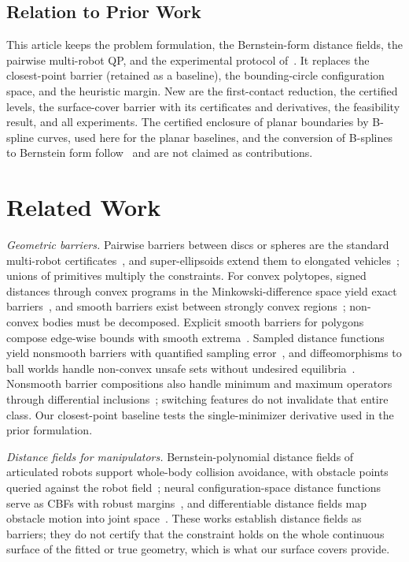 \documentclass[journal]{IEEEtran}
\theoremstyle{definition}
\begin{document}
\subsection{Relation to Prior Work}\label{sec:relation}
This article keeps the problem formulation, the Bernstein-form distance fields, the pairwise
multi-robot QP, and the experimental protocol of~\cite{jo2026geometry}. It replaces the
closest-point barrier (retained as a baseline), the bounding-circle configuration space, and the
heuristic margin. New are the first-contact reduction, the certified levels, the surface-cover
barrier with its certificates and derivatives, the feasibility result, and all experiments. The
certified enclosure of planar boundaries by B-spline curves, used here for the planar baselines, and
the conversion of B-splines to Bernstein form follow~\cite{jo2027semantic} and are not claimed as
contributions.

\section{Related Work}\label{sec:related}

\emph{Geometric barriers.} Pairwise barriers between discs or spheres are the standard multi-robot
certificates~\cite{wang2017safety}, and super-ellipsoids extend them to elongated
vehicles~\cite{wang2017quadrotors}; unions of primitives multiply the constraints. For convex
polytopes, signed distances through convex programs in the Minkowski-difference space yield exact
barriers~\cite{chen2025minkowski,chen2026exact}, and smooth barriers exist between strongly convex
regions~\cite{thirugnanam2025strongly}; non-convex bodies must be decomposed. Explicit smooth
barriers for polygons compose edge-wise bounds with smooth extrema~\cite{wu2025optimization}.
Sampled distance functions yield nonsmooth barriers with quantified sampling
error~\cite{lutkus2025sampling}, and diffeomorphisms to ball worlds handle non-convex unsafe sets
without undesired equilibria~\cite{notomista2021nonconvex}.
Nonsmooth barrier compositions also handle minimum and maximum operators through differential
inclusions~\cite{glotfelter2017nonsmooth}; switching features do not invalidate that entire class.
Our closest-point baseline tests the single-minimizer derivative used in the prior formulation.

\emph{Distance fields for manipulators.} Bernstein-polynomial distance fields of articulated robots
support whole-body collision avoidance, with obstacle points queried against the robot
field~\cite{li2024representing}; neural configuration-space distance functions serve as CBFs with
robust margins~\cite{long2025neural}, and differentiable distance fields map obstacle motion into
joint space~\cite{chi2024safe}. These works establish distance fields as barriers; they do not
certify that the constraint holds on the whole continuous surface of the fitted or true geometry,
which is what our surface covers provide.
\end{document}
